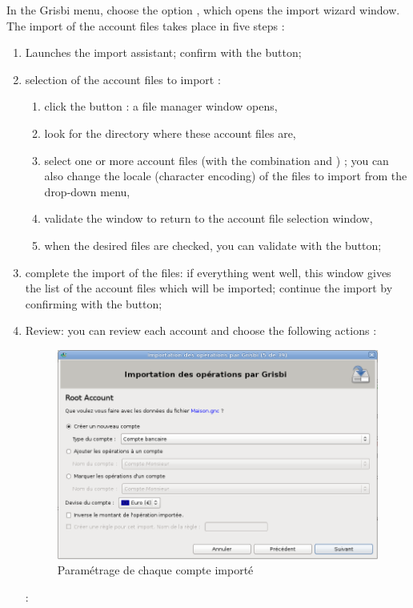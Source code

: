 
In the Grisbi  menu, choose the option  , which opens the import wizard window. The import of the account files takes place in five steps :

\begin{enumerate}
	\item Launches the import assistant; confirm with the  button;
	\item selection of the account files to import :	
		\begin{enumerate}
			\item click the button  : a file manager window opens,	
			\item look for the directory where these account files are,
			\item select one or more account files (with the combination    and ) ; you can also change the \gls{locale} (\gls{character encoding}) of the files to import from the  drop-down menu,
			\item validate the window to return to the account file selection window,
			\item when the desired files are checked, you can validate with the  button;
		\end{enumerate}		  
	\item complete the import of the files: if everything went well, this window gives the list of the account files which will be imported; continue the import by confirming with the  button;
	\item Review: you can review each account and choose the following actions \ifIllustration {} :
	\begin{figure}[htbp]
	\begin{center}
	\includegraphics[scale=0.5]{image/screenshot/QIF_import_files_setup}
	\end{center}
	\caption{Paramétrage de chaque compte importé}
	\label{QIF-import-files-setup-img}
	\end{figure}
	\else  :
	\fi
	

\end{enumerate}

